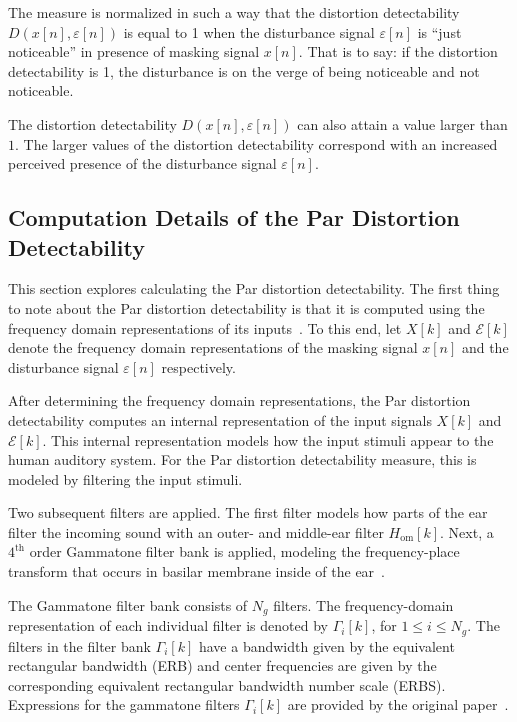 The measure is normalized in such a way that the distortion detectability $D(x[n],\varepsilon[n])$ is equal to 1 when the disturbance signal $\varepsilon[n]$ is ``just noticeable'' in presence of masking signal $x[n]$.
That is to say: if the distortion detectability is 1, the disturbance is on the verge of being noticeable and not noticeable.

The distortion detectability $D(x[n],\varepsilon[n])$ can also attain a value larger than $1$.
The larger values of the distortion detectability correspond with an increased perceived presence of the disturbance signal $\varepsilon[n]$.

\subsection{Computation Details of the Par Distortion Detectability}
\label{ch:perceptual:implementation:computation}
This section explores calculating the Par distortion detectability.
The first thing to note about the Par distortion detectability is that it is computed using the frequency domain representations of its inputs~\cite{van2005perceptual}. 
To this end, let $X[k]$ and $\mathcal{E}[k]$ denote the frequency domain representations of the masking signal $x[n]$ and 
the disturbance signal $\varepsilon[n]$ respectively.

After determining the frequency domain representations, 
the Par distortion detectability computes an internal representation of the input signals $X[k]$ and $\mathcal{E}[k]$.
This internal representation models how the input stimuli appear to the human auditory system.
For the Par distortion detectability measure, this is modeled by filtering the input stimuli.

Two subsequent filters are applied.
The first filter models how parts of the ear filter the incoming sound with an outer- and middle-ear filter $H_\text{om}[k]$. 
Next, a $4^\text{th}$ order Gammatone filter bank is applied, modeling the frequency-place transform that occurs in 
basilar membrane inside of the ear~\cite{van2005perceptual}.

The Gammatone filter bank consists of $N_g$ filters.
The frequency-domain representation of each individual filter is denoted by $\Gamma_i[k]$, for $1 \leq i \leq N_g$. 
The filters in the filter bank $\Gamma_i[k]$ have a bandwidth given by the equivalent 
rectangular bandwidth (ERB) and center frequencies are given by the corresponding equivalent rectangular bandwidth number
scale (ERBS).
Expressions for the gammatone filters $\Gamma_i[k]$ are provided by the original paper~\cite{van2005perceptual}.

